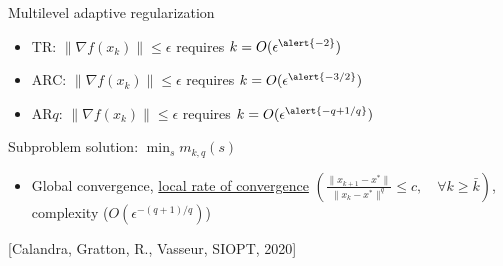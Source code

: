 \documentclass{beamer}
\begin{document}
		\begin{frame}{Multilevel adaptive regularization}
		\begin{tcolorbox}[
		title=AR$q$: a better wort-case complexity,
    colback=gray!15,
    colframe=gray!50,
    arc=3mm,
    boxrule=0pt
]
	
		\begin{itemize}
		\item TR: $\|\nabla f(x_k)\|\leq \epsilon$ requires $k=O(\epsilon^{\alert{-2}})$ 
		\item ARC: $\|\nabla f(x_k)\|\leq \epsilon$ requires $k=O(\epsilon^{\alert{-3/2}})$ 
		\item AR$q$: $\|\nabla f(x_k)\|\leq \epsilon$ requires $k=O(\epsilon^{\alert{-q+1/q}})$ 
		\end{itemize}
		\end{tcolorbox}	
		
		\begin{footnotesize}
\begin{tcolorbox}[
        title={\faExclamationTriangle\ Bottleneck},
    colback=red!10,
    colframe=red!70!black,
        fonttitle=\bfseries,
]
Subproblem solution: $\displaystyle \min_s m_{k,q}(s) $

\end{tcolorbox}
\end{footnotesize}


		\begin{tcolorbox}[
        title={\faSmile\  Multilevel extension MAR$q$ 
},
    colback=green!10,
    colframe=green!70!black,
        fonttitle=\bfseries,
]

				\begin{itemize}
		\item Global convergence, \underline{local rate of convergence} $\left(\frac{\|x_{k+1}-x^*\|}{\|x_k-x^*\|^q}\leq c, \quad \forall k\geq\bar{k}
\right)$, complexity ($O(\epsilon^{-(q+1)/q})$)
		\end{itemize}



		
		

\end{tcolorbox}

\small{ \textcolor{mygreen}{[Calandra, Gratton, R., Vasseur, SIOPT, 2020]}}


		
\end{frame}
\end{document}
